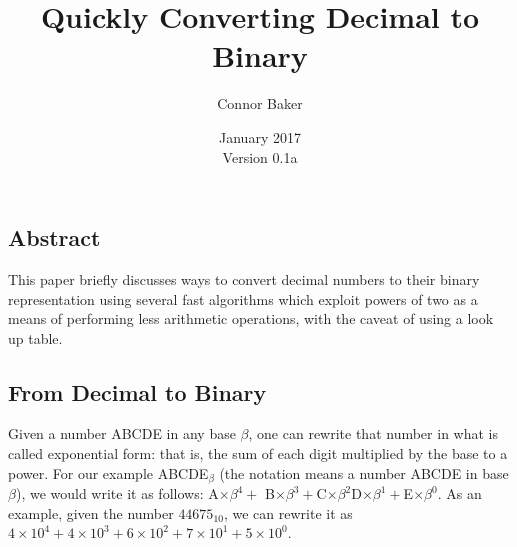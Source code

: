 \documentclass[12pt]{article}
\begin{document}

\null
\nointerlineskip
\vfill
\let \snewpage \newpage
\let \newpage \relax
\title{Quickly Converting Decimal to Binary}
\author{Connor Baker}
\date{January 2017\\Version 0.1a}
\maketitle

\begin{center}
  \subsection*{Abstract}
\end{center}
This paper briefly discusses ways to convert decimal numbers to their binary representation using several fast algorithms which exploit powers of two as a means of performing less arithmetic operations, with the caveat of using a look up table.

\let \newpage \snewpage
\vfill
\thispagestyle{empty}


\newpage %



\makeatletter
{}
\makeatother
\tableofcontents

\clearpage
{}



\newpage %



\begin{center}
  \section{From Decimal to Binary}
\end{center}
Given a number ABCDE in any base $\beta$, one can rewrite that number in what is called exponential form: that is, the sum of each digit multiplied by the base to a power. For our example ABCDE$_{\beta}$ (the notation means a number ABCDE in base $\beta$), we would write it as follows: A$\times\beta^4 +$ B$\times\beta^3 + $C$\times\beta^2 $D$\times\beta^1 + $E$\times\beta^0$. As an example, given the number $44675_{10}$, we can rewrite it as $4\times10^4 + 4\times10^3 + 6\times10^2 + 7\times10^1 + 5\times10^0$.
\end{document}
